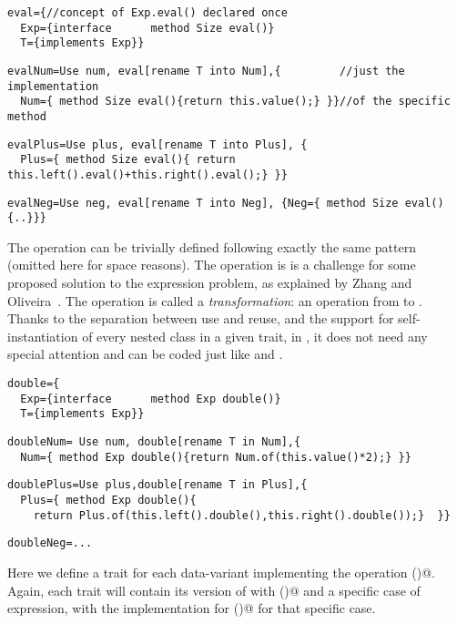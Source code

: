 \begin{lstlisting}
eval={//concept of Exp.eval() declared once
  Exp={interface      method Size eval()}
  T={implements Exp}}
\end{lstlisting}
\multiCode
\begin{lstlisting}
evalNum=Use num, eval[rename T into Num],{         //just the implementation
  Num={ method Size eval(){return this.value();} }}//of the specific method
\end{lstlisting}
\multiCode
\begin{lstlisting}
evalPlus=Use plus, eval[rename T into Plus], {
  Plus={ method Size eval(){ return this.left().eval()+this.right().eval();} }}
\end{lstlisting}
\multiCode
\begin{lstlisting}
evalNeg=Use neg, eval[rename T into Neg], {Neg={ method Size eval(){..}}}
\end{lstlisting}

The \Q@show@ operation can be trivially defined
following exactly the same pattern (omitted here for space reasons).
The operation \Q@double@ is is a challenge for some proposed solution
to the expression problem, as explained by Zhang and Oliveira~\cite{zhang2017evf}.
The \Q@double@ operation is called a \emph{transformation}: an operation from \Q@Exp@ to \Q@Exp@.
Thanks to the separation between use and reuse, and the support
for self-instantiation of every nested class in a given trait,
in \name, it does not need any special attention
and can be coded just like \Q@eval@ and \Q@show@.
\begin{lstlisting}
double={
  Exp={interface      method Exp double()}
  T={implements Exp}}
\end{lstlisting}
\multiCode
\begin{lstlisting}
doubleNum= Use num, double[rename T in Num],{
  Num={ method Exp double(){return Num.of(this.value()*2);} }}
\end{lstlisting}
\multiCode
\begin{lstlisting}
doublePlus=Use plus,double[rename T in Plus],{
  Plus={ method Exp double(){
    return Plus.of(this.left().double(),this.right().double());}  }}
\end{lstlisting}
\multiCode
\begin{lstlisting}
doubleNeg=...
\end{lstlisting}
Here we define a trait for each data-variant implementing the operation \Q@double()@.
Again, each trait will contain its version of \Q@Exp@ with \Q@double()@
and a specific case of expression, with the implementation for \Q@double()@
for that specific case.

